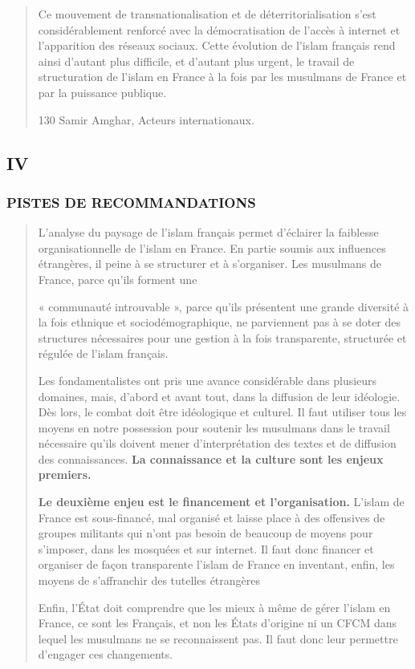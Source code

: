 \begin{quote}
Ce mouvement de transnationalisation et de déterritorialisation s'est
considérablement renforcé avec la démocratisation de l'accès à internet
et l'apparition des réseaux sociaux. Cette évolution de l'islam français
rend ainsi d'autant plus difficile, et d'autant plus urgent, le travail
de structuration de l'islam en France à la fois par les musulmans de
France et par la puissance publique.

130 Samir Amghar, Acteurs internationaux.
\end{quote}

\hypertarget{iv}{%
\subsection{IV}\label{iv}}

\hypertarget{pistes-de-recommandations}{%
\subsubsection{PISTES DE
RECOMMANDATIONS}\label{pistes-de-recommandations}}

\begin{quote}
L'analyse du paysage de l'islam français permet d'éclairer la faiblesse
organisationnelle de l'islam en France. En partie soumis aux influences
étrangères, il peine à se structurer et à s'organiser. Les musulmans de
France, parce qu'ils forment une

« communauté introuvable », parce qu'ils présentent une grande diversité
à la fois ethnique et sociodémographique, ne parviennent pas à se doter
des structures nécessaires pour une gestion à la fois transparente,
structurée et régulée de l'islam français.

Les fondamentalistes ont pris une avance considérable dans plusieurs
domaines, mais, d'abord et avant tout, dans la diffusion de leur
idéologie. Dès lors, le combat doit être idéologique et culturel. Il
faut utiliser tous les moyens en notre possession pour soutenir les
musulmans dans le travail nécessaire qu'ils doivent mener
d'interprétation des textes et de diffusion des connaissances.
\textbf{La connaissance et la culture sont les enjeux premiers.}

\textbf{Le deuxième enjeu est le financement et l'organisation.} L'islam
de France est sous-financé, mal organisé et laisse place à des
offensives de groupes militants qui n'ont pas besoin de beaucoup de
moyens pour s'imposer, dans les mosquées et sur internet. Il faut donc
financer et organiser de façon transparente l'islam de France en
inventant, enfin, les moyens de s'affranchir des tutelles étrangères

Enfin, l'État doit comprendre que les mieux à même de gérer l'islam en
France, ce sont les Français, et non les États d'origine ni un CFCM dans
lequel les musulmans ne se reconnaissent pas. Il faut donc leur
permettre d'engager ces changements.


\end{quote}


